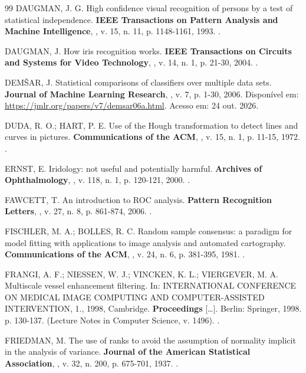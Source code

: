 \begin{thebibliography}{99}
DAUGMAN, J. G. High confidence visual recognition of persons by a test of
statistical independence. \textbf{IEEE Transactions on Pattern Analysis and
Machine Intelligence}, \semlocal, v. 15, n. 11, p. 1148-1161, 1993.
.

DAUGMAN, J. How iris recognition works. \textbf{IEEE Transactions on Circuits
and Systems for Video Technology}, \semlocal, v. 14, n. 1, p. 21-30, 2004.
.

DEMŠAR, J. Statistical comparisons of classifiers over multiple data sets.
\textbf{Journal of Machine Learning Research}, \semlocal, v. 7, p. 1-30,
2006. Disponível em: \url{https://jmlr.org/papers/v7/demsar06a.html}. Acesso
em: 24 out. 2026.

DUDA, R. O.; HART, P. E. Use of the Hough transformation to detect lines and
curves in pictures. \textbf{Communications of the ACM}, \semlocal, v. 15,
n. 1, p. 11-15, 1972. .

ERNST, E. Iridology: not useful and potentially harmful. \textbf{Archives of
Ophthalmology}, \semlocal, v. 118, n. 1, p. 120-121, 2000.
.

FAWCETT, T. An introduction to ROC analysis. \textbf{Pattern Recognition
Letters}, \semlocal, v. 27, n. 8, p. 861-874, 2006.
.

FISCHLER, M. A.; BOLLES, R. C. Random sample consensus: a paradigm for model
fitting with applications to image analysis and automated cartography.
\textbf{Communications of the ACM}, \semlocal, v. 24, n. 6, p. 381-395, 1981.
.

FRANGI, A. F.; NIESSEN, W. J.; VINCKEN, K. L.; VIERGEVER, M. A. Multiscale
vessel enhancement filtering. In: INTERNATIONAL CONFERENCE ON MEDICAL IMAGE
COMPUTING AND COMPUTER-ASSISTED INTERVENTION, 1., 1998, Cambridge.
\textbf{Proceedings} [\dots]. Berlin: Springer, 1998. p. 130-137. (Lecture
Notes in Computer Science, v. 1496). .

FRIEDMAN, M. The use of ranks to avoid the assumption of normality implicit
in the analysis of variance. \textbf{Journal of the American Statistical
Association}, \semlocal, v. 32, n. 200, p. 675-701, 1937.
.


\end{thebibliography}
